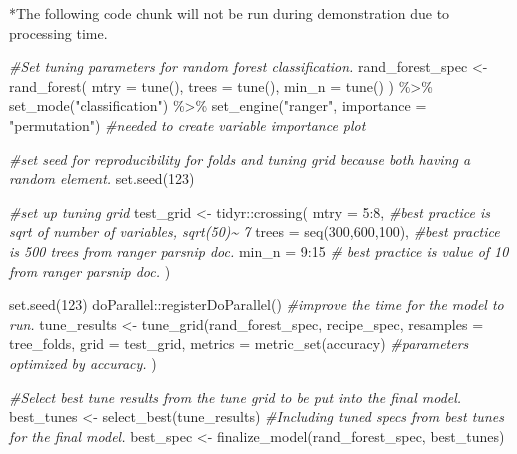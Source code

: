 \documentclass[
]{article}
\newenvironment{Shaded}{\begin{snugshade}}{\end{snugshade}}
\newcommand{\AttributeTok}[1]{\textcolor[rgb]{0.77,0.63,0.00}{#1}}
\newcommand{\CommentTok}[1]{\textcolor[rgb]{0.56,0.35,0.01}{\textit{#1}}}
\newcommand{\DecValTok}[1]{\textcolor[rgb]{0.00,0.00,0.81}{#1}}
\newcommand{\FunctionTok}[1]{\textcolor[rgb]{0.00,0.00,0.00}{#1}}
\newcommand{\NormalTok}[1]{#1}
\newcommand{\OtherTok}[1]{\textcolor[rgb]{0.56,0.35,0.01}{#1}}
\newcommand{\SpecialCharTok}[1]{\textcolor[rgb]{0.00,0.00,0.00}{#1}}
\newcommand{\StringTok}[1]{\textcolor[rgb]{0.31,0.60,0.02}{#1}}
\begin{document}
*The following code chunk will not be run during demonstration due to
processing time.

\begin{Shaded}
\begin{Highlighting}[]
\CommentTok{\#Set tuning parameters for random forest classification.}
\NormalTok{rand\_forest\_spec }\OtherTok{\textless{}{-}} \FunctionTok{rand\_forest}\NormalTok{(}
  \AttributeTok{mtry  =} \FunctionTok{tune}\NormalTok{(), }
  \AttributeTok{trees =} \FunctionTok{tune}\NormalTok{(), }
  \AttributeTok{min\_n =} \FunctionTok{tune}\NormalTok{()}
\NormalTok{) }\SpecialCharTok{\%\textgreater{}\%}
  \FunctionTok{set\_mode}\NormalTok{(}\StringTok{"classification"}\NormalTok{) }\SpecialCharTok{\%\textgreater{}\%}
  \FunctionTok{set\_engine}\NormalTok{(}\StringTok{"ranger"}\NormalTok{, }\AttributeTok{importance =} \StringTok{"permutation"}\NormalTok{) }\CommentTok{\#needed to create variable importance plot}

\CommentTok{\#set seed for reproducibility for folds and tuning grid because both having a random element.}
\FunctionTok{set.seed}\NormalTok{(}\DecValTok{123}\NormalTok{)}

\CommentTok{\#set up tuning grid}
\NormalTok{test\_grid }\OtherTok{\textless{}{-}}\NormalTok{ tidyr}\SpecialCharTok{::}\FunctionTok{crossing}\NormalTok{(}
  \AttributeTok{mtry  =} \DecValTok{5}\SpecialCharTok{:}\DecValTok{8}\NormalTok{, }\CommentTok{\#best practice is sqrt of number of variables, sqrt(50)\textasciitilde{} 7}
  \AttributeTok{trees =} \FunctionTok{seq}\NormalTok{(}\DecValTok{300}\NormalTok{,}\DecValTok{600}\NormalTok{,}\DecValTok{100}\NormalTok{), }\CommentTok{\#best practice is 500 trees from ranger parsnip doc.}
  \AttributeTok{min\_n =} \DecValTok{9}\SpecialCharTok{:}\DecValTok{15} \CommentTok{\# best practice is value of 10 from ranger parsnip doc.}
\NormalTok{)}

\FunctionTok{set.seed}\NormalTok{(}\DecValTok{123}\NormalTok{)}
\NormalTok{doParallel}\SpecialCharTok{::}\FunctionTok{registerDoParallel}\NormalTok{() }\CommentTok{\#improve the time for the model to run. }
\NormalTok{tune\_results }\OtherTok{\textless{}{-}} \FunctionTok{tune\_grid}\NormalTok{(rand\_forest\_spec, }
\NormalTok{                          recipe\_spec,}
                          \AttributeTok{resamples =}\NormalTok{ tree\_folds,}
                          \AttributeTok{grid      =}\NormalTok{ test\_grid,}
                          \AttributeTok{metrics   =} \FunctionTok{metric\_set}\NormalTok{(accuracy) }\CommentTok{\#parameters optimized by accuracy.}
\NormalTok{                          )}

\CommentTok{\#Select best tune results from the tune grid to be put into the final model. }
\NormalTok{best\_tunes }\OtherTok{\textless{}{-}} \FunctionTok{select\_best}\NormalTok{(tune\_results)}
\CommentTok{\#Including tuned specs from best tunes for the final model. }
\NormalTok{best\_spec }\OtherTok{\textless{}{-}} \FunctionTok{finalize\_model}\NormalTok{(rand\_forest\_spec, best\_tunes)}
\end{Highlighting}
\end{Shaded}
\end{document}
